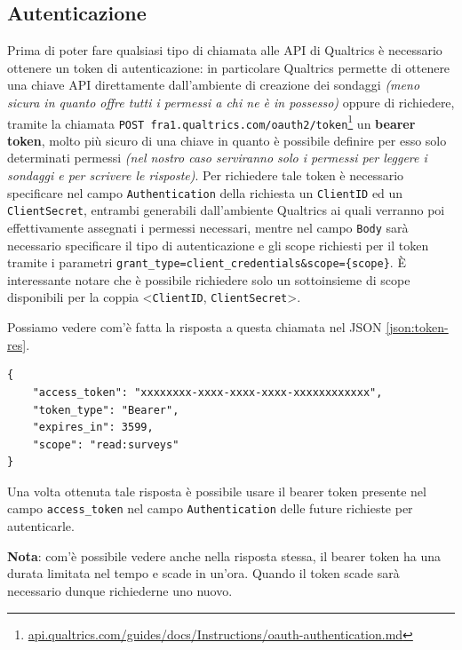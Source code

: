 \subsection{Autenticazione}
Prima di poter fare qualsiasi tipo di chiamata alle API di Qualtrics è necessario ottenere un token di autenticazione: in particolare Qualtrics permette di ottenere una chiave API direttamente dall'ambiente di creazione dei sondaggi \textit{(meno sicura in quanto offre tutti i permessi a chi ne è in possesso)} oppure di richiedere, tramite la chiamata \texttt{POST fra1.qualtrics.com/oauth2/token}\footnote{\url{api.qualtrics.com/guides/docs/Instructions/oauth-authentication.md}} un \textbf{bearer token}, molto più sicuro di una chiave in quanto è possibile definire per esso solo determinati permessi \textit{(nel nostro caso serviranno solo i permessi per leggere i sondaggi e per scrivere le risposte)}.
Per richiedere tale token è necessario specificare nel campo \texttt{Authentication} della richiesta un \texttt{ClientID} ed un \texttt{ClientSecret}, entrambi generabili dall'ambiente Qualtrics ai quali verranno poi effettivamente assegnati i permessi necessari, mentre nel campo \texttt{Body} sarà necessario specificare il tipo di autenticazione e gli scope richiesti per il token tramite i parametri \texttt{grant\_type=client\_credentials\&scope=\{scope\}}. È interessante notare che è possibile richiedere solo un sottoinsieme di scope disponibili per la coppia <\texttt{ClientID}, \texttt{ClientSecret}>.

Possiamo vedere com'è fatta la risposta a questa chiamata nel JSON \ref{json:token-res}.

\begin{json}
\begin{verbatim}
{
	"access_token": "xxxxxxxx-xxxx-xxxx-xxxx-xxxxxxxxxxxx",
	"token_type": "Bearer",
	"expires_in": 3599,
	"scope": "read:surveys"
}
\end{verbatim}
\caption{Risposta a chiamata /oauth2/token}
\label{json:token-res}
\end{json}

Una volta ottenuta tale risposta è possibile usare il bearer token presente nel campo \texttt{access\_token} nel campo \texttt{Authentication} delle future richieste per autenticarle.

\textbf{Nota}: com'è possibile vedere anche nella risposta stessa, il bearer token ha una durata limitata nel tempo e scade in un'ora. Quando il token scade sarà necessario dunque richiederne uno nuovo.

